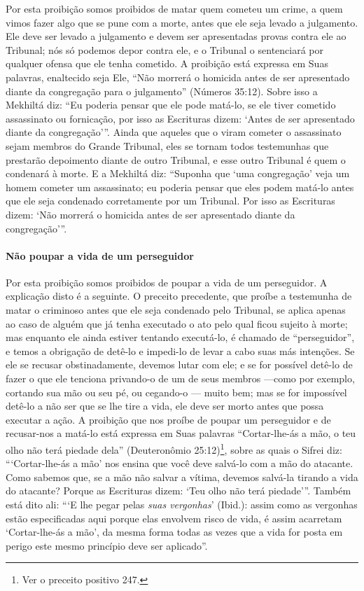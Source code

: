 Por esta proibição somos proibidos de matar quem cometeu um crime, a
quem vimos fazer algo que se pune com a morte, antes que ele seja levado
a julgamento. Ele deve ser levado a julgamento e devem ser apresentadas
provas contra ele ao Tribunal; nós só podemos depor contra ele, e o
Tribunal o sentenciará por qualquer ofensa que ele tenha cometido. A
proibição está expressa em Suas palavras, enaltecido seja Ele, ``Não
morrerá o homicida antes de ser apresentado diante da congregação para
o julgamento'' (Números 35:12). Sobre isso a Mekhiltá diz: ``Eu poderia
pensar que ele pode matá-lo, se ele tiver cometido assassinato ou
fornicação, por isso as Escrituras dizem: `Antes de ser apresentado
diante da congregação'''. Ainda que aqueles que o viram cometer o
assassinato sejam membros do Grande Tribunal, eles se tornam todos
testemunhas que prestarão depoimento diante de outro Tribunal, e esse
outro Tribunal é quem o condenará à morte. E a Mekhiltá diz: ``Suponha
que `uma congregação' veja um homem cometer um assassinato; eu poderia
pensar que eles podem matá-lo antes que ele seja condenado corretamente
por um Tribunal. Por isso as Escrituras dizem: `Não morrerá o homicida
antes de ser apresentado diante da congregação'''.

\paragraph{Não poupar a vida de um perseguidor}

Por esta proibição somos proibidos de poupar a vida de um perseguidor. A
explicação disto é a seguinte. O preceito precedente, que proíbe a
testemunha de matar o criminoso antes que ele seja condenado pelo Tribunal,
se aplica apenas ao caso de alguém que já tenha executado o ato pelo
qual ficou sujeito à morte; mas enquanto ele ainda estiver tentando
executá-lo, é chamado de ``perseguidor'', e temos a obrigação de detê-lo
e impedi-lo de levar a cabo suas más intenções. Se ele se recusar
obstinadamente, devemos lutar com ele; e se for possível detê-lo de
fazer o que ele tenciona privando-o de um de seus membros ---como por
exemplo, cortando sua mão ou seu pé, ou cegando-o --- muito bem; mas se
for impossível detê-lo a não ser que se lhe tire a vida, ele deve ser
morto antes que possa executar a ação. A proibição que nos proíbe de
poupar um perseguidor e de recusar-nos a matá-lo está expressa em Suas
palavras ``Cortar-lhe-ás a mão, o teu olho não terá piedade dela''
(Deuteronômio 25:12)\footnote{Ver o preceito positivo 247.}, sobre as quais o Sifrei diz:
```Cortar-lhe-ás a mão' nos ensina que você deve salvá-lo com a mão do
atacante. Como sabemos que, se a mão não salvar a vítima, devemos
salvá-la tirando a vida do atacante? Porque as Escrituras dizem: `Teu
olho não terá piedade'''. Também está dito ali: ```E lhe pegar pelas
\emph{suas vergonhas}' (Ibid.): assim como as vergonhas estão
especificadas aqui porque elas envolvem risco de vida, é assim acarretam
`Cortar-lhe-ás a mão', da mesma forma todas as vezes que a vida for
posta em perigo este mesmo princípio deve ser aplicado''.

